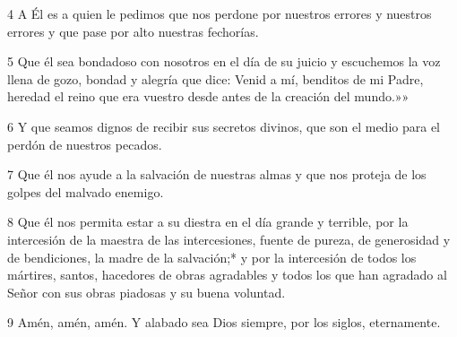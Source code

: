 \par 4 A Él es a quien le pedimos que nos perdone por nuestros errores y nuestros errores y que pase por alto nuestras fechorías.

\par 5 Que él sea bondadoso con nosotros en el día de su juicio y escuchemos la voz llena de gozo, bondad y alegría que dice: Venid a mí, benditos de mi Padre, heredad el reino que era vuestro desde antes de la creación del mundo.»»

\par 6 Y que seamos dignos de recibir sus secretos divinos, que son el medio para el perdón de nuestros pecados.

\par 7 Que él nos ayude a la salvación de nuestras almas y que nos proteja de los golpes del malvado enemigo.

\par 8 Que él nos permita estar a su diestra en el día grande y terrible, por la intercesión de la maestra de las intercesiones, fuente de pureza, de generosidad y de bendiciones, la madre de la salvación;* y por la intercesión de todos los mártires, santos, hacedores de obras agradables y todos los que han agradado al Señor con sus obras piadosas y su buena voluntad.

\par 9 Amén, amén, amén. Y alabado sea Dios siempre, por los siglos, eternamente.

